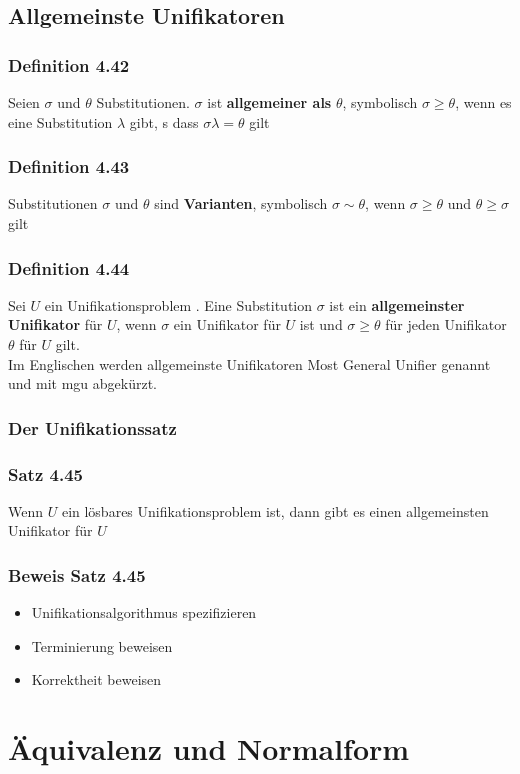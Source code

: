 \subsection{Allgemeinste Unifikatoren}
\subsubsection{Definition 4.42}
Seien \(\sigma\) und \(\theta\) Substitutionen. \(\sigma\) ist \textbf{allgemeiner als} \(\theta\), symbolisch \(\sigma \ge \theta \), wenn es eine Substitution \(\lambda\) gibt, s dass \(\sigma \lambda = \theta \) gilt
\subsubsection{Definition 4.43}
Substitutionen \(\sigma \) und \(\theta \) sind \textbf{Varianten}, symbolisch \(\sigma \sim \theta\), wenn \(\sigma \ge \theta \) und \(\theta \ge \sigma \) gilt
\subsubsection{Definition 4.44}
Sei \(U\) ein Unifikationsproblem . Eine Substitution \(\sigma \) ist ein \textbf{allgemeinster Unifikator} für \(U\), wenn \(\sigma\) ein Unifikator für \(U\) ist und \(\sigma \ge \theta \) für jeden Unifikator \(\theta \) für \(U\) gilt. \\
Im Englischen werden allgemeinste Unifikatoren Most General Unifier genannt und mit mgu abgekürzt.
\subsubsection{Der Unifikationssatz}
\subsubsection{Satz 4.45}
Wenn \(U\) ein lösbares Unifikationsproblem ist, dann gibt es einen allgemeinsten Unifikator für \(U\)
\subsubsection{Beweis Satz 4.45}
\begin{itemize}
	\item Unifikationsalgorithmus spezifizieren
	\item Terminierung beweisen
	\item Korrektheit beweisen
\end{itemize}

\section{Äquivalenz und Normalform}
